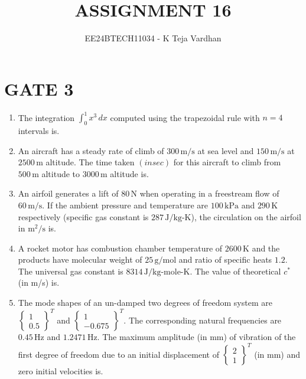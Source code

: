 \documentclass[journal]{IEEEtran}
\newcommand{\brak}[1]{\left( #1 \right)}
\begin{document}

\title{ASSIGNMENT 16}
\author{EE24BTECH11034 - K Teja Vardhan}
{\let\newpage\relax\maketitle}

\section{GATE 3}
\begin{enumerate}

    \item The integration $ \int_0^1 x^3 \, dx $ computed using the trapezoidal rule with $ n = 4 $ intervals is.
    
    \item An aircraft has a steady rate of climb of $300 \, \text{m/s}$ at sea level and $150 \, \text{m/s}$ at $2500 \, \text{m}$ altitude. The time taken $\brak{in sec}$ for this aircraft to climb from $500 \, \text{m}$ altitude to $3000 \, \text{m}$ altitude is.
    
    \item An airfoil generates a lift of $80 \, \text{N}$ when operating in a freestream flow of $60 \, \text{m/s}$. If the ambient pressure and temperature are $100 \, \text{kPa}$ and $290 \, \text{K}$ respectively (specific gas constant is $287 \, \text{J/kg-K}$), the circulation on the airfoil in $ \text{m}^2/\text{s} $ is.
    
    \item A rocket motor has combustion chamber temperature of $2600 \, \text{K}$ and the products have molecular weight of $25 \, \text{g/mol}$ and ratio of specific heats $1.2$. The universal gas constant is $8314 \, \text{J/kg-mole-K}$. The value of theoretical $ c^* $ (in m/s) is.
    
    \item The mode shapes of an un-damped two degrees of freedom system are $ \begin{Bmatrix} 1 \\ 0.5 \end{Bmatrix}^T $ and $ \begin{Bmatrix} 1 \\ -0.675 \end{Bmatrix}^T $. The corresponding natural frequencies are $0.45 \, \text{Hz}$ and $1.2471 \, \text{Hz}$. The maximum amplitude (in mm) of vibration of the first degree of freedom due to an initial displacement of $ \begin{Bmatrix} 2 \\ 1 \end{Bmatrix}^T $ (in mm) and zero initial velocities is.
    

\end{enumerate}
\end{document}
